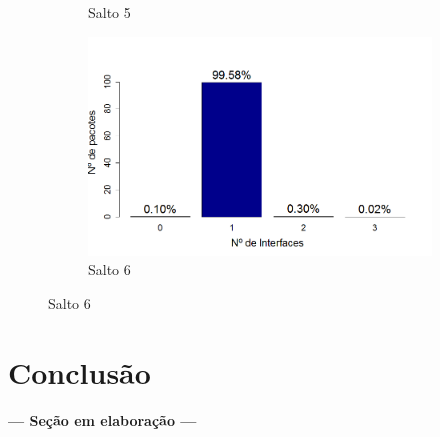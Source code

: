 \documentclass[
	12pt,				%
	openright,			%
	oneside,
	a4paper,			%
	english,			%
	french,				%
	spanish,			%
	brazil				%
	]{abntex2}
\begin{document}
\begin{figure}[t!]
\begin{subfigure}{.5\textwidth}
		\captionsetup{width=.9\textwidth}
		\caption{Salto 5}
		\label{dpr_opt_s5}
	\end{subfigure}%
	\begin{subfigure}{.5\textwidth}
		\centering
		\includegraphics[width=.98\linewidth]{DRP_OPT_Salto6}
		\captionsetup{width=.9\textwidth}
		\caption{Salto 6}
		\label{dpr_opt_s6}
	\end{subfigure}
\end{figure}


\chapter{Conclusão} \label{chap_concl}

\begin{center}
	\textbf{--- Seção em elaboração ---}
\end{center}

\postextual



%
%
\end{document}
